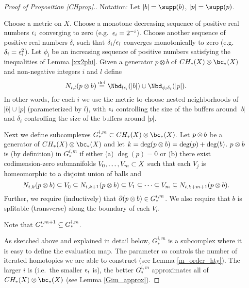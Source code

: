 \begin{proof}[Proof of Proposition \ref{CHprop}.]
Notation: Let $|b| = \supp(b)$, $|p| = \supp(p)$.

Choose a metric on $X$.
Choose a monotone decreasing sequence of positive real numbers $\epsilon_i$ converging to zero
(e.g.\ $\epsilon_i = 2^{-i}$).
Choose another sequence of positive real numbers $\delta_i$ such that $\delta_i/\epsilon_i$
converges monotonically to zero (e.g.\ $\delta_i = \epsilon_i^2$).
Let $\phi_l$ be an increasing sequence of positive numbers
satisfying the inequalities of Lemma \ref{xx2phi}.
Given a generator $p\otimes b$ of $CH_*(X)\otimes \bc_*(X)$ and non-negative integers $i$ and $l$
define
\[
	N_{i,l}(p\ot b) \deq \Nbd_{l\ep_i}(|b|) \cup \Nbd_{\phi_l\delta_i}(|p|).
\]
In other words, for each $i$
we use the metric to choose nested neighborhoods of $|b|\cup |p|$ (parameterized
by $l$), with $\epsilon_i$ controlling the size of the buffers around $|b|$ and $\delta_i$ controlling
the size of the buffers around $|p|$.

Next we define subcomplexes $G_*^{i,m} \sub CH_*(X)\otimes \bc_*(X)$.
Let $p\otimes b$ be a generator of $CH_*(X)\otimes \bc_*(X)$ and let $k = \deg(p\otimes b)
= \deg(p) + \deg(b)$.
$p\otimes b$ is (by definition) in $G_*^{i,m}$ if either (a) $\deg(p) = 0$ or (b)
there exist codimension-zero submanifolds $V_0,\ldots,V_m \subset X$ such that each $V_j$
is homeomorphic to a disjoint union of balls and
\[
	N_{i,k}(p\otimes b) \subseteq V_0 \subseteq N_{i,k+1}(p\otimes b)
			\subseteq V_1 \subseteq \cdots \subseteq V_m \subseteq N_{i,k+m+1}(p\otimes b) .
\]
Further, we require (inductively) that $\partial(p\otimes b) \in G_*^{i,m}$.
We also require that $b$ is splitable (transverse) along the boundary of each $V_l$.

Note that $G_*^{i,m+1} \subseteq G_*^{i,m}$.

As sketched above and explained in detail below, 
$G_*^{i,m}$ is a subcomplex where it is easy to define
the evaluation map.
The parameter $m$ controls the number of iterated homotopies we are able to construct
(see Lemma \ref{m_order_hty}).
The larger $i$ is (i.e.\ the smaller $\epsilon_i$ is), the better $G_*^{i,m}$ approximates all of
$CH_*(X)\ot \bc_*(X)$ (see Lemma \ref{Gim_approx}).


\end{proof}
